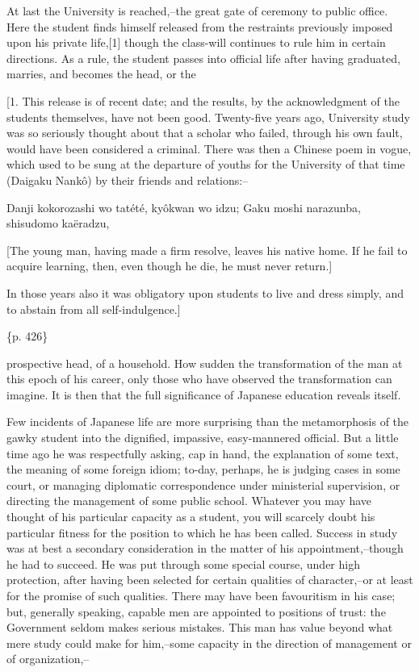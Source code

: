 At last the University is reached,--the great gate of ceremony to public office. Here the student finds himself released from the restraints previously imposed upon his private life,[1] though the class-will continues to rule him in certain directions. As a rule, the student passes into official life after having graduated, marries, and becomes the head, or the

[1. This release is of recent date; and the results, by the acknowledgment of the students themselves, have not been good. Twenty-five years ago, University study was so seriously thought about that a scholar who failed, through his own fault, would have been considered a criminal. There was then a Chinese poem in vogue, which used to be sung at the departure of youths for the University of that time (Daigaku Nankô) by their friends and relations:--

Danji kokorozashi wo tatété, kyôkwan wo idzu;
Gaku moshi narazunba, shisudomo kaëradzu,

[The young man, having made a firm resolve, leaves his native home.
If he fail to acquire learning, then, even though he die, he must never return.]

In those years also it was obligatory upon students to live and dress simply, and to abstain from all self-indulgence.]

\{p. 426\}

prospective head, of a household. How sudden the transformation of the man at this epoch of his career, only those who have observed the transformation can imagine. It is then that the full significance of Japanese education reveals itself.

Few incidents of Japanese life are more surprising than the metamorphosis of the gawky student into the dignified, impassive, easy-mannered official. But a little time ago he was respectfully asking, cap in hand, the explanation of some text, the meaning of some foreign idiom; to-day, perhaps, he is judging cases in some court, or managing diplomatic correspondence under ministerial supervision, or directing the management of some public school. Whatever you may have thought of his particular capacity as a student, you will scarcely doubt his particular fitness for the position to which he has been called. Success in study was at best a secondary consideration in the matter of his appointment,--though he had to succeed. He was put through some special course, under high protection, after having been selected for certain qualities of character,--or at least for the promise of such qualities. There may have been favouritism in his case; but, generally speaking, capable men are appointed to positions of trust: the Government seldom makes serious mistakes. This man has value beyond what mere study could make for him,--some capacity in the direction of management or of organization,--

